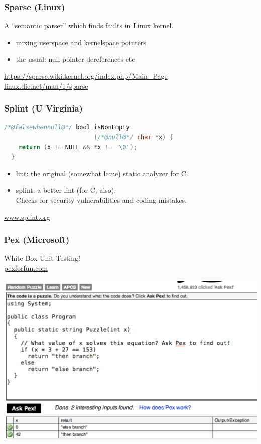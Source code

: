 \documentclass{beamer}
\newenvironment{changemargin}[1]{%
  \begin{list}{}{%
    \setlength{\topsep}{0pt}%
    \setlength{\leftmargin}{#1}%
    \setlength{\rightmargin}{1em}
    \setlength{\listparindent}{\parindent}%
    \setlength{\itemindent}{\parindent}%
    \setlength{\parsep}{\parskip}%
  }%
  \item[]}{\end{list}}
\begin{document}
\begin{frame}
  \frametitle{Sparse (Linux)}
  \begin{changemargin}{1.5cm}
    A ``semantic parser'' which finds faults in Linux kernel.
    \begin{itemize}
    \item mixing userspace and kernelspace pointers
    \item the usual: null pointer dereferences etc
    \end{itemize}
  \end{changemargin}
\begin{center}    
    \url{https://sparse.wiki.kernel.org/index.php/Main_Page}\\
    \url{linux.die.net/man/1/sparse}
\end{center}
\end{frame}

\begin{frame}[fragile]
  \frametitle{Splint (U Virginia)}
\hspace*{.5cm}\begin{lstlisting}[language=C]
  /*@falsewhennull@*/ bool isNonEmpty
                         (/*@null@*/ char *x) {
    return (x != NULL && *x != '\0');
  }
    \end{lstlisting}
  \begin{changemargin}{1.5cm}
    \begin{itemize}
    \item lint: the original (somewhat lame) static analyzer for C.
    \item splint: a better lint (for C, also).\\
      Checks for security vulnerabilities and coding mistakes.
    \end{itemize}
  \end{changemargin}
  \begin{center}
    \url{www.splint.org}
  \end{center}
\end{frame}

\begin{frame}[fragile]
  \frametitle{Pex (Microsoft)}
\hspace*{2cm}  White Box Unit Testing!\\
\hspace*{2cm}  \url{pexforfun.com}
\begin{center}
  \includegraphics[width=.9\textwidth]{L11/pexforfun.png}
\end{center}
\end{frame}
      
\end{document}
